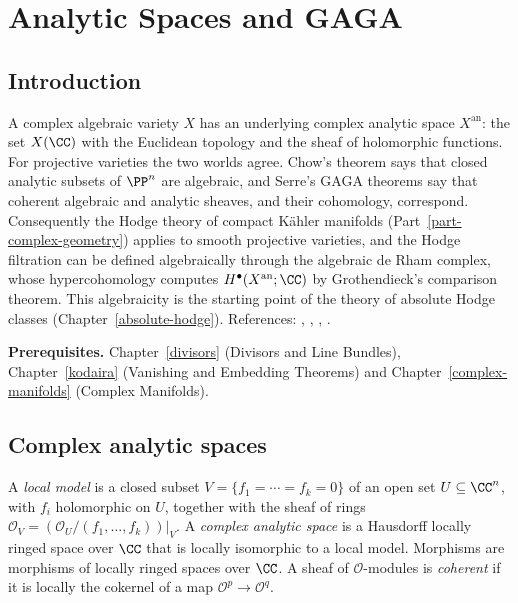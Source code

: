 \chapter{Analytic Spaces and GAGA}\label{gaga}

\section{Introduction}\label{gaga:section-introduction}

A complex algebraic variety $X$ has an underlying complex analytic space $X^{\mathrm{an}}$: the set $X(\CC)$ with the Euclidean topology and the sheaf of
holomorphic functions. For projective varieties the two worlds agree. Chow's theorem says that closed analytic subsets of $\PP^n$ are algebraic, and
Serre's GAGA theorems say that coherent algebraic and analytic sheaves, and their cohomology, correspond. Consequently the Hodge theory of compact
K\"ahler manifolds (Part~\ref{part-complex-geometry}) applies to smooth projective varieties, and the Hodge filtration can be defined algebraically through
the algebraic de Rham complex, whose hypercohomology computes $H^\bullet(X^{\mathrm{an}}; \CC)$ by Grothendieck's comparison theorem. This algebraicity is
the starting point of the theory of absolute Hodge classes (Chapter~\ref{absolute-hodge}). References: \cite{serre-gaga}, \cite[Appendix B]{hartshorne-ag},
\cite[Chapter 1]{griffiths-harris}, \cite{grothendieck-de-rham}.

\noindent\textbf{Prerequisites.} Chapter~\ref{divisors} (Divisors and Line Bundles), Chapter~\ref{kodaira} (Vanishing and Embedding Theorems) and
Chapter~\ref{complex-manifolds} (Complex Manifolds).

\section{Complex analytic spaces}\label{gaga:section-analytic-spaces}

\begin{definition}\label{gaga:definition-analytic-space}
A \emph{local model} is a closed subset $V = \{f_1 = \cdots = f_k = 0\}$ of an open set $U \subseteq \CC^n$, with $f_i$ holomorphic on $U$, together with the sheaf
of rings $\mathcal{O}_V = (\mathcal{O}_U/(f_1, \ldots, f_k))|_V$. A \emph{complex analytic space} is a Hausdorff locally ringed space over $\CC$ that is locally isomorphic to a
local model. Morphisms are morphisms of locally ringed spaces over $\CC$. A sheaf of $\mathcal{O}$-modules is \emph{coherent} if it is locally the cokernel of a map
$\mathcal{O}^p \to \mathcal{O}^q$.
\end{definition}

